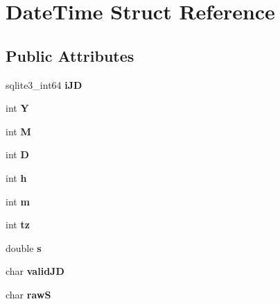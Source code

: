\hypertarget{struct_date_time}{}\section{Date\+Time Struct Reference}
\label{struct_date_time}
\subsection*{Public Attributes}
\begin{DoxyCompactItemize}
\item 
\mbox{\label{struct_date_time_ae5043d34fa3c3c4dc1121fec886c6f10}} 
sqlite3\+\_\+int64 {\bfseries i\+JD}
\item 
\mbox{\label{struct_date_time_ad39449618b2a15128e32766a208753cf}} 
int {\bfseries Y}
\item 
\mbox{\label{struct_date_time_a00e6515603bb5d7c5ce79d3a5a6438a7}} 
int {\bfseries M}
\item 
\mbox{\label{struct_date_time_a979ec52428a05d2f2ed827345a416fa6}} 
int {\bfseries D}
\item 
\mbox{\label{struct_date_time_a2146547149b65f64e07e1ac6ed8654b6}} 
int {\bfseries h}
\item 
\mbox{\label{struct_date_time_ac5db527c48331a515bea3b828d1a2254}} 
int {\bfseries m}
\item 
\mbox{\label{struct_date_time_a7f5c2e587ee18014982d85eb616f09b8}} 
int {\bfseries tz}
\item 
\mbox{\label{struct_date_time_a69a803afb69b74206418bda0bc1bcaa2}} 
double {\bfseries s}
\item 
\mbox{\label{struct_date_time_a1962742892150a03dc5d302f43efbb04}} 
char {\bfseries valid\+JD}
\item 
\mbox{\label{struct_date_time_a16edfd51f7db44033955b106a09759ee}} 
char {\bfseries rawS}
\item 
\mbox{\label{struct_date_time_aaa042bec0879cd922039062433f4b26f}} 

\end{DoxyCompactItemize}
